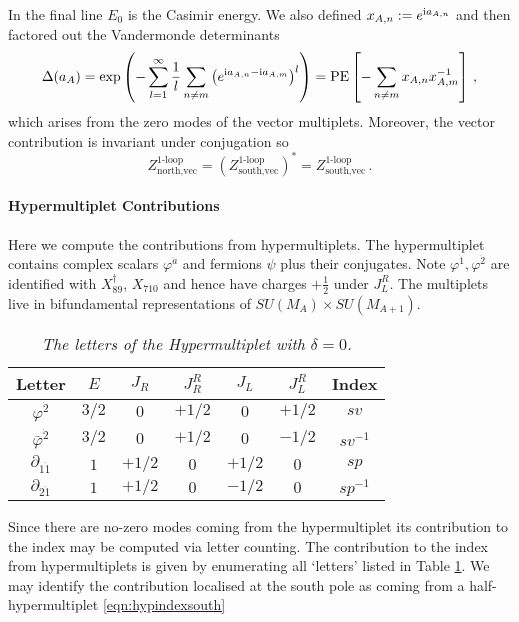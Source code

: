 \documentclass[main.tex]{subfiles}
\begin{document}
In the final line $E_0$ is the Casimir energy. We also defined $x_{A,n}:=e^{\mathrm{i} a_{A,n}}$ and then factored out the Vandermonde determinants 
\begin{equation}
\Delta(a_A)=\exp\left(-\sum_{l=1}^{\infty}\frac{1}{l}\sum_{n\neq m}\left(e^{\mathrm{i} a_{A,n}-\mathrm{i} a_{A,m}}\right)^{l}\right)=\operatorname{\mathrm{PE}}\left[-\sum_{n\neq m}x_{A,n}x_{A,m}^{-1}\right]\,,
\end{equation}
which arises from the zero modes of the vector multiplets. Moreover, the vector contribution is invariant under conjugation so
\begin{equation}
Z^{\text{1-loop}}_{\text{north},\text{vec}}=\left(
Z^{\text{1-loop}}_{\text{south},\text{vec}}\right)^*=
Z^{\text{1-loop}}_{\text{south},\text{vec}}\,.
\end{equation}
\paragraph{Hypermultiplet Contributions}
Here we compute the contributions from hypermultiplets. The hypermultiplet contains complex scalars $\varphi^{\dot a}$ and fermions $\psi$ plus their conjugates. Note $\varphi^{\dot1},\varphi^{\dot2}$ are identified with $X_{89}^{\dagger}$, $X_{710}$ and hence have charges $+\frac{1}{2}$ under $J_L^R$. The multiplets live in bifundamental representations of $SU(M_{A})\times SU(M_{A+1})$.
\begin{table}
\centering
 \begin{tabular}{|c|c|c|c|c|c|c|} 
 \hline
Letter & $E$& $J_R$ &$J_R^R$& $J_L$&$J_L^R$& Index\\\hline
\hline
$\varphi^{\dot2}$ &$3/2$ & $0$& $+1/2$&$0$& $+1/2$ & $sv$\\\hline
$\bar{\varphi}^{\dot2}$ &$3/2$ & $0$& $+1/2$&$0$& $-1/2$ & $sv^{-1}$\\\hline
\hline
$\partial_{1\dot1}$ &$1$ &$+1/2$ & $0$ &$+1/2$&$0$&$sp$\\\hline
$\partial_{2\dot1}$ &$1$ &$+1/2$ & $0$ & $-1/2$&$0$&$sp^{-1}$\\\hline
\end{tabular}
\caption{\it The letters of the Hypermultiplet with $\delta=0$.}
 \label{tab:hypletters}
\end{table}
Since there are no-zero modes coming from the hypermultiplet its contribution to the index may be computed via letter counting. The contribution to the index from hypermultiplets is given by enumerating all `letters' listed in Table \ref{tab:hypletters}. We may identify the contribution localised at the south pole as coming from a half-hypermultiplet \eqref{eqn:hypindexsouth}
\end{document}
